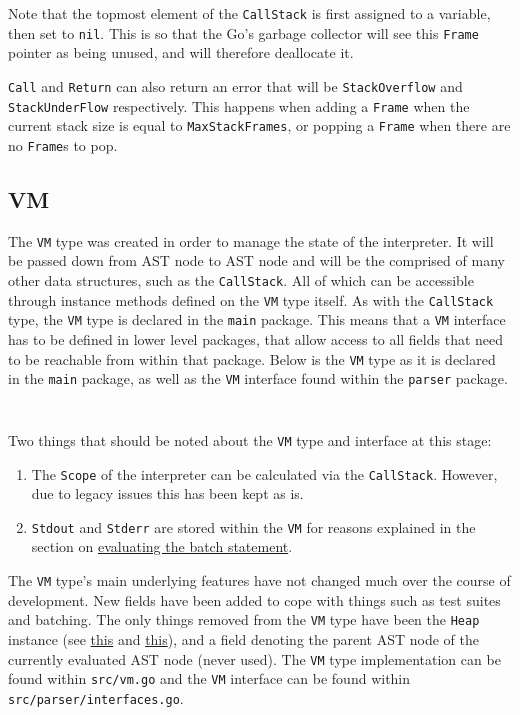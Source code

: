 \inputminted[firstline=140, lastline=151, autogobble, breaklines, tabsize=4]{go}{../../src/call.go}

Note that the topmost element of the \verb|CallStack| is first assigned to a variable, then set to \verb|nil|. This is so that the Go's garbage collector will see this \verb|Frame| pointer as being unused, and will therefore deallocate it.

\verb|Call| and \verb|Return| can also return an error that will be \verb|StackOverflow| and \verb|StackUnderFlow| respectively. This happens when adding a \verb|Frame| when the current stack size is equal to \verb|MaxStackFrames|, or popping a \verb|Frame| when there are no \verb|Frame|s to pop.

\subsection{VM}
\label{sec:data-structures-vm}

The \verb|VM| type was created in order to manage the state of the interpreter. It will be passed down from AST node to AST node and will be the comprised of many other data structures, such as the \verb|CallStack|. All of which can be accessible through instance methods defined on the \verb|VM| type itself. As with the \verb|CallStack| type, the \verb|VM| type is declared in the \verb|main| package. This means that a \verb|VM| interface has to be defined in lower level packages, that allow access to all fields that need to be reachable from within that package. Below is the \verb|VM| type as it is declared in the \verb|main| package, as well as the \verb|VM| interface found within the \verb|parser| package.

\inputminted[firstline=15, lastline=37, autogobble, breaklines, tabsize=4]{go}{../../src/vm.go}

\inputminted[firstline=18, lastline=60, autogobble, breaklines, tabsize=4]{go}{../../src/parser/interfaces.go}

Two things that should be noted about the \verb|VM| type and interface at this stage:

\begin{enumerate}
    \item The \verb|Scope| of the interpreter can be calculated via the \verb|CallStack|. However, due to legacy issues this has been kept as is.
    \item \verb|Stdout| and \verb|Stderr| are stored within the \verb|VM| for reasons explained in the section on \hyperref[sec:eval-ast-nodes-batch]{evaluating the batch statement}.
\end{enumerate}

The \verb|VM| type's main underlying features have not changed much over the course of development. New fields have been added to cope with things such as test suites and batching. The only things removed from the \verb|VM| type have been the \verb|Heap| instance (see \hyperref[sec:data-structures-frames-callstack]{this} and \hyperref[sec:data-structures-heap]{this}), and a field denoting the parent AST node of the currently evaluated AST node (never used). The \verb|VM| type implementation can be found within \verb|src/vm.go| and the \verb|VM| interface can be found within \verb|src/parser/interfaces.go|.
